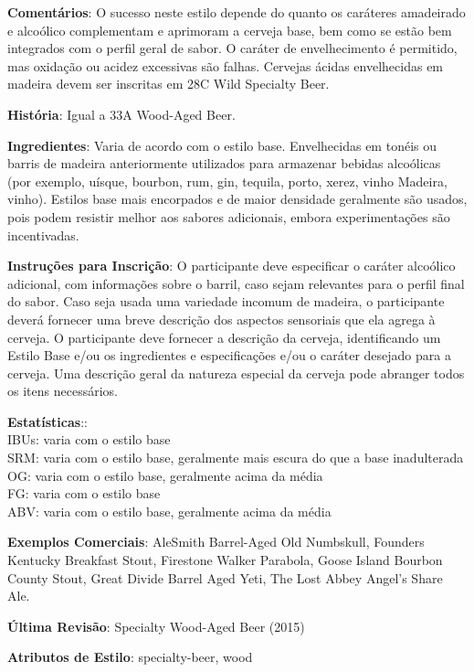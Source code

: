 \textbf{Comentários}: O sucesso neste estilo depende do quanto os caráteres amadeirado e alcoólico complementam e aprimoram a cerveja base, bem como se estão bem integrados com o perfil geral de sabor. O caráter de envelhecimento é permitido, mas oxidação ou acidez excessivas são falhas. Cervejas ácidas envelhecidas em madeira devem ser inscritas em 28C Wild Specialty Beer.

\textbf{História}: Igual a 33A Wood-Aged Beer.

\textbf{Ingredientes}: Varia de acordo com o estilo base. Envelhecidas em tonéis ou barris de madeira anteriormente utilizados para armazenar bebidas alcoólicas (por exemplo, uísque, bourbon, rum, gin, tequila, porto, xerez, vinho Madeira, vinho). Estilos base mais encorpados e de maior densidade geralmente são usados, pois podem resistir melhor aos sabores adicionais, embora experimentações são incentivadas.

\textbf{Instruções para Inscrição}: O participante deve especificar o caráter alcoólico adicional, com informações sobre o barril, caso sejam relevantes para o perfil final do sabor. Caso seja usada uma variedade incomum de madeira, o participante deverá fornecer uma breve descrição dos aspectos sensoriais que ela agrega à cerveja. O participante deve fornecer a descrição da cerveja, identificando um Estilo Base e/ou os ingredientes e especificações e/ou o caráter desejado para a cerveja. Uma descrição geral da natureza especial da cerveja pode abranger todos os itens necessários.

\textbf{Estatísticas}::\\
IBUs: varia com o estilo base\\
SRM: varia com o estilo base, geralmente mais escura do que a base inadulterada\\
OG: varia com o estilo base, geralmente acima da média\\
FG: varia com o estilo base\\
ABV: varia com o estilo base, geralmente acima da média

\textbf{Exemplos Comerciais}: AleSmith Barrel-Aged Old Numbskull, Founders Kentucky Breakfast Stout, Firestone Walker Parabola, Goose Island Bourbon County Stout, Great Divide Barrel Aged Yeti, The Lost Abbey Angel’s Share Ale.

\textbf{Última Revisão}: Specialty Wood-Aged Beer (2015)

\textbf{Atributos de Estilo}: specialty-beer, wood
